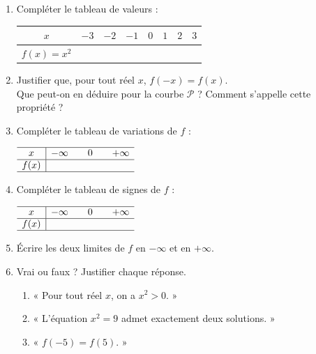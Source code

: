 \documentclass[11pt,a4paper]{article}
\begin{document}
\begin{enumerate}[leftmargin=1.4em,itemsep=3pt]
  \item Compléter le tableau de valeurs :
  \begin{center}
  \begin{tabular}{|c|c|c|c|c|c|c|c|}
  \hline
  $x$ & $-3$ & $-2$ & $-1$ & $0$ & $1$ & $2$ & $3$\\ \hline
  $f(x)=x^2$ & & & & & & & \\ \hline
  \end{tabular}
  \end{center}

  \item Justifier que, pour tout réel $x$, $f(-x)=f(x)$. \\
  Que peut-on en déduire pour la courbe $\mathcal{P}$ ? Comment s'appelle cette propriété ?

  \item Compléter le tableau de variations de $f$ :
  \begin{center}
  $\begin{array}{c|ccccc}
  \hline
  x & -\infty & & 0 & & +\infty\\ \hline
  f(x) & & & & & \\ \hline
  \end{array}$
  \end{center}

  \item Compléter le tableau de signes de $f$ :
  \begin{center}
  $\begin{array}{c|ccccc}
  \hline
  x & -\infty & & 0 & & +\infty\\ \hline
  f(x) & & & & & \\ \hline
  \end{array}$
  \end{center}

  \item Écrire les deux limites de $f$ en $-\infty$ et en $+\infty$.

  \item Vrai ou faux ? Justifier chaque réponse.
  \begin{enumerate}[label=\alph*),leftmargin=1.6em,itemsep=1pt]
    \item « Pour tout réel $x$, on a $x^2>0$. »
    \item « L'équation $x^2=9$ admet exactement deux solutions. »
    \item « $f(-5)=f(5)$. »
  \end{enumerate}
\end{enumerate}
\end{document}
